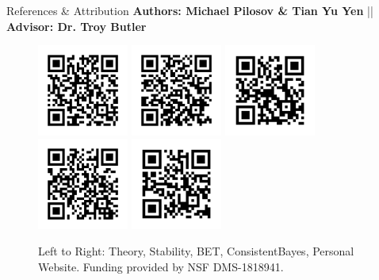 \begin{block}{References \& Attribution}
    \centering
    \textbf{Authors: Michael Pilosov \& Tian Yu Yen} || \textbf{Advisor: Dr. Troy Butler}
    \begin{figure}
        \includegraphics[width=3cm]{figures/ref-theory}
        \includegraphics[width=3cm]{figures/ref-stability}
        \includegraphics[width=3cm]{figures/ref-bet}
        \includegraphics[width=3cm]{figures/ref-cb}
        \includegraphics[width=3cm]{figures/ref-website}
    \caption{\centering Left to Right: Theory, Stability, BET, ConsistentBayes, Personal Website. \newline Funding provided by NSF DMS-1818941.}
    \end{figure}

\end{block}

